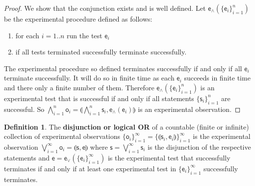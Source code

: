 \documentclass[review]{elsarticle}
\theoremstyle{plain}%
\theoremstyle{definition}
\newtheorem{defn}{Definition}[section]
\theoremstyle{remark}
\begin{document}
\begin{proof}
	We show that the conjunction exists and is well defined. Let $\mathsf{e}_\wedge(\{\mathsf{e}_i\}_{i=1}^{n})$ be the experimental procedure defined as follows:
	\begin{enumerate}
	\item for each $i=1..n$ run the test $\mathsf{e}_i$
	\item if all tests terminated successfully terminate successfully.
	\end{enumerate}
	The experimental procedure so defined terminates successfully if and only if all $\mathsf{e}_i$ terminate successfully. It will do so in finite time as each $\mathsf{e}_i$ succeeds in finite time and there only a finite number of them. Therefore $\mathsf{e}_\wedge(\{\mathsf{e}_i\}_{i=1}^{n})$ is an experimental test that is successful if and only if all statements $\{\mathsf{s}_i\}_{i=1}^{n}$ are successful. So $\bigwedge\limits_{i=1}^{n} \mathsf{o}_i = \llparenthesis\bigwedge\limits_{i=1}^{n} \mathsf{s}_i, \mathsf{e}_{\wedge}(\mathsf{e}_i)\rrparenthesis$ is an experimental observation.
\end{proof}

\begin{defn}
	The \textbf{disjunction or logical OR} of a countable (finite or infinite) collection of experimental observations $\{\mathsf{o}_i\}_{i=1}^{\infty}=\{\llparenthesis \mathsf{s}_i, \mathsf{e}_i\rrparenthesis\}_{i=1}^{\infty}$ is the experimental observation $\bigvee\limits_{i=1}^{\infty} \mathsf{o}_i = \llparenthesis \mathsf{s}, \mathsf{e}\rrparenthesis$ where $\mathsf{s} = \bigvee\limits_{i=1}^{\infty} \mathsf{s}_i$ is the disjunction of the respective statements and $\mathsf{e} = \mathsf{e}_\vee(\{\mathsf{e}_i\}_{i=1}^{\infty})$ is the experimental test that successfully terminates if and only if at least one experimental test in $\{\mathsf{e}_i\}_{i=1}^{\infty}$ successfully terminates.
\end{defn}
\end{document}
